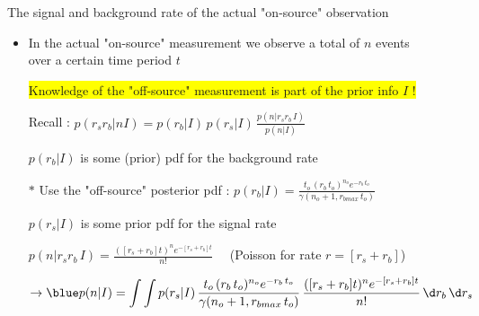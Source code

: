 \Tr
\begin{center}
{\red The signal and background rate of the actual "on-source" observation} 
\end{center}
%
\begin{itemize}
\item In the actual "on-source" measurement we observe a total of $n$ events\\
      over a certain time period $t$
\item[] \colorbox{yellow}{Knowledge of the "off-source" measurement is part of the prior info $I$ !}
\item[] Recall :
        {\blue $\displaystyle p(r_{s}r_{b}|nI)=p(r_{b}|I)\,p(r_{s}|I)\,\frac{p(n|r_{s}r_{b}\,I)}{p(n|I)}$}
\item[] $p(r_{b}|I)$ is some (prior) pdf for the background rate
\item[$\ast$] {\red Use the "off-source" posterior pdf :}
              {\blue $\displaystyle p(r_{b}|I)=
               \frac{t_{o}\,(r_{b}\,t_{o})^{n_{o}} e^{-r_{b}\,t_{o}}}{\gamma(n_{o}+1,r_{bmax}\,t_{o})}$}
\item[] $p(r_{s}|I)$ is some prior pdf for the signal rate
\item[] {\blue $\displaystyle p(n|r_{s}r_{b}\,I)=\frac{([r_{s}+r_{b}] t)^{n} e^{-[r_{s}+r_{b}] t}}{n!} \quad$}
        (Poisson for rate $r=[r_{s}+r_{b}]$)
\item[] $\rightarrow {\blue \displaystyle p(n|I)=\int \int p(r_{s}|I)\,
                       \frac{t_{o}\,(r_{b}\,t_{o})^{n_{o}} e^{-r_{b}\,t_{o}}}{\gamma(n_{o}+1,r_{bmax}\,t_{o})}\,
                       \frac{([r_{s}+r_{b}] t)^{n} e^{-[r_{s}+r_{b}] t}}{n!}
                       \,\d r_{b}\,\d r_{s}}$
\end{itemize}

